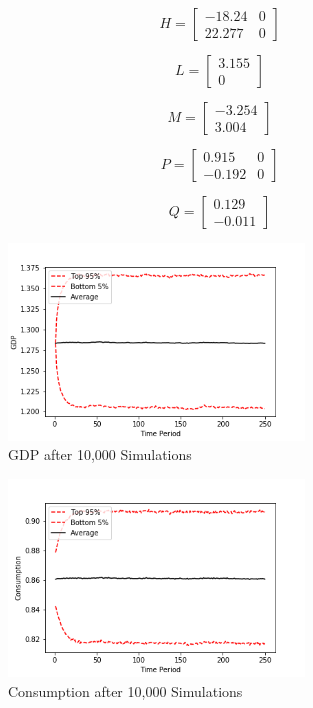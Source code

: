 \documentclass[letterpaper,11pt]{article}
\theoremstyle{definition}
\begin{document}
\begin{spacing}{1.5}
\begin{Exercise}
			\[
				H =
				\begin{bmatrix}
					-18.24 & 0 \\
					22.277 & 0
				\end{bmatrix}
			\]

			\[
				L =
				\begin{bmatrix}
					3.155 \\
					0
				\end{bmatrix}
			\]

			\[
				M =
				\begin{bmatrix}
					-3.254 \\
					3.004
				\end{bmatrix}
			\]

			\[
				P =
				\begin{bmatrix}
					0.915 & 0 \\
					-0.192 & 0
				\end{bmatrix}
			\]

			\[
				Q =
				\begin{bmatrix}
					0.129\\
					-0.011
				\end{bmatrix}
			\]
	\end{Exercise}

	\begin{Exercise} \label{Linear_HW_Base_Sims}
		\begin{figure}[H]
			\caption{GDP after 10,000 Simulations}
			\label{fig:GDP_10000}
			\includegraphics[width=0.7\textwidth]{GDP.png}
		\end{figure}

		\begin{figure}[H]
			\caption{Consumption after 10,000 Simulations}
			\label{fig:consumption_10000}
			\includegraphics[width=0.7\textwidth]{consumption.png}
		\end{figure}


\end{Exercise}
\end{spacing}
\end{document}
